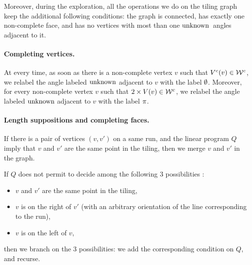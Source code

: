 \documentclass[11pt]{article}
\theoremstyle{definition}
\begin{document}
Moreover, during the exploration, all the operations we do on the tiling graph keep the additional following conditions: the graph is connected, has exactly one non-complete face, and has no vertices with most than one $\operatorname{unknown}$~angles adjacent to it.
%
%
%
%
%

%


%

%

%

%

%

%
%

%

%

%

%

%
%
%

%

\paragraph{Completing vertices.}
At every time, as soon as there is a non-complete vertex $v$ such that ${V^c}(v)\in {{\mathcal{W}}^c}$, we relabel the angle labeled $\operatorname{unknown}$ adjacent to $v$ with the label $\emptyset$.
Moreover, for every non-complete vertex $v$ such that $2\times V(v)\in {{\mathcal{W}}^c}$, we relabel the angle labeled $\operatorname{unknown}$ adjacent to $v$ with the label $\pi$.

\paragraph{Length suppositions and completing faces.}
If there is a pair of vertices $(v,v')$ on a same run, and the linear program $Q$ imply that $v$ and $v'$ are the same point in the tiling, then we merge $v$ and $v'$ in the graph.

If $Q$ does not permit to decide among the following 3 possibilities :
\begin{itemize}
\item $v$ and $v'$ are the same point in the tiling,
\item $v$ is on the right of $v'$ (with an arbitrary orientation of the line corresponding to the run),
\item $v$ is on the left of $v$,
\end{itemize}
then we branch on the 3 possibilities: we add the corresponding condition on $Q$, and recurse.
\end{document}
